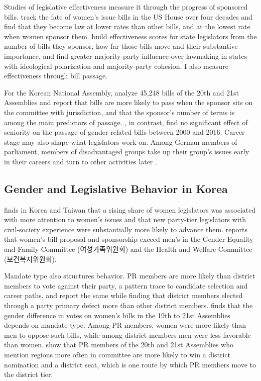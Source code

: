 \documentclass[11pt]{article}
\begin{document}
Studies of legislative effectiveness measure it through the progress of sponsored bills. \citet{volden2016} track the fate of women's issue bills in the US House over four decades and find that they become law at lower rates than other bills, and at the lowest rate when women sponsor them. \citet{bucchianeri2024} build effectiveness scores for state legislators from the number of bills they sponsor, how far those bills move and their substantive importance, and find greater majority-party influence over lawmaking in states with ideological polarization and majority-party cohesion. I also measure effectiveness through bill passage.

For the Korean National Assembly, \citet{an2025} analyze 45,248 bills of the 20th and 21st Assemblies and report that bills are more likely to pass when the sponsor sits on the committee with jurisdiction, and that the sponsor's number of terms is among the main predictors of passage. \citet{leelee2020}, in contrast, find no significant effect of seniority on the passage of gender-related bills between 2000 and 2016. Career stage may also shape what legislators work on. Among German members of parliament, members of disadvantaged groups take up their group's issues early in their careers and turn to other activities later \citep{bailer2021}.

\subsection{Gender and Legislative Behavior in Korea}

\citet{shim2021a} finds in Korea and Taiwan that a rising share of women legislators was associated with more attention to women's issues and that new party-tier legislators with civil-society experience were substantially more likely to advance them. \citet{shin2022} reports that women's bill proposal and sponsorship exceed men's in the Gender Equality and Family Committee (여성가족위원회) and the Health and Welfare Committee (보건복지위원회).

Mandate type also structures behavior. PR members are more likely than district members to vote against their party, a pattern \citet{jun2010} trace to candidate selection and career paths, and \citet{kimpark2022} report the same while finding that district members elected through a party primary defect more than other district members. \citet{jung2025} finds that the gender difference in votes on women's bills in the 19th to 21st Assemblies depends on mandate type. Among PR members, women were more likely than men to oppose such bills, while among district members men were less favorable than women. \citet{im2025} show that PR members of the 20th and 21st Assemblies who mention regions more often in committee are more likely to win a district nomination and a district seat, which is one route by which PR members move to the district tier.
\end{document}
